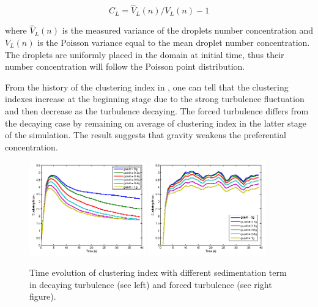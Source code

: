 \begin{equation}
C_L = \hat{V}_L(n)/V_L(n)-1
\label{eq:cluster_index}
\end{equation}

where $\hat{V}_L(n)$ is the measured variance of the droplets number
concentration and $V_L(n)$ is the Poisson variance equal to the mean droplet
number concentration. The droplets are uniformly placed in the domain at
initial time, thus their number concentration will follow the Poisson point
distribution.

From the history of the clustering index in , one can
tell that the clustering indexes increase at the beginning stage due to the
strong turbulence fluctuation and then decrease as the turbulence decaying. The
forced turbulence differs from the decaying case by remaining on average of
clustering index in the latter stage of the simulation. The result suggests
that gravity weakens the preferential concentration. 

\begin{figure}[!htbp]\centering
\includegraphics[width=0.45\textwidth]{Figures/gravity_time_decay}
\includegraphics[width=0.45\textwidth]{Figures/gravity_time_force}
\caption{Time evolution of clustering index with different sedimentation term in decaying turbulence (see left) and
forced turbulence (see right figure).}
\label{fig:gravity_cluster}
\end{figure}

